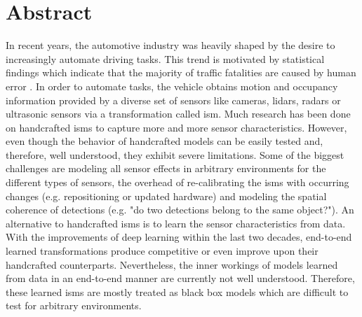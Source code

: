 {
\pagestyle{empty}
\section*{Abstract}
\label{ch:abstract}
In recent years, the automotive industry was heavily shaped by the desire to increasingly automate driving tasks. This trend is motivated by statistical findings which indicate that the majority of traffic fatalities are caused by human error \cite{world2018global}. In order to automate tasks, the vehicle obtains motion and occupancy information provided by a diverse set of sensors like cameras, lidars, radars or ultrasonic sensors via a transformation called \gls{ism}. Much research has been done on handcrafted \gls{ism}s to capture more and more sensor characteristics. However, even though the behavior of handcrafted models can be easily tested and, therefore, well understood, they exhibit severe limitations. Some of the biggest challenges are modeling all sensor effects in arbitrary environments for the different types of sensors, the overhead of re-calibrating the \gls{ism}s with occurring changes (e.g. repositioning or updated hardware) and modeling the spatial coherence of detections (e.g. "do two detections belong to the same object?"). An alternative to handcrafted \gls{ism}s is to learn the sensor characteristics from data. With the improvements of deep learning within the last two decades, end-to-end learned transformations produce competitive or even improve upon their handcrafted counterparts. Nevertheless, the inner workings of models learned from data in an end-to-end manner are currently not well understood. Therefore, these learned \gls{ism}s are mostly treated as black box models which are difficult to test for arbitrary environments.
\\\\
}
